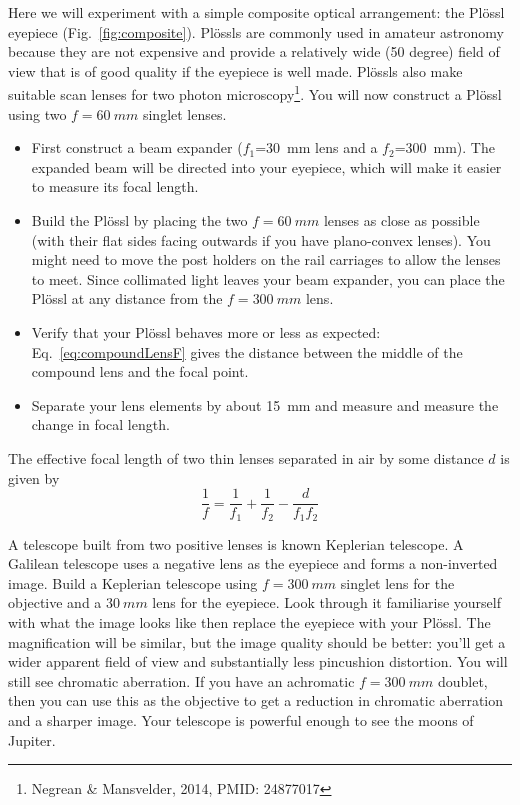 \documentclass[a4paper]{report}
\begin{document}
Here we will experiment with a simple composite optical arrangement: the Pl\"{o}ssl eyepiece (Fig.~\ref{fig:composite}). 
Pl\"{o}ssls are commonly used in amateur astronomy because they are not expensive and provide a relatively wide (50 degree) field of view that is of good 
quality if the eyepiece is well made. 
Pl\"{o}ssls also make suitable scan lenses for two photon microscopy\footnote{Negrean \& Mansvelder, 2014, PMID: 24877017}.
You will now construct a Pl\"{o}ssl using two $f=60~mm$ singlet lenses.


\begin{itemize}
\item First construct a beam expander ($f_1$=30~mm lens and a $f_2$=300~mm). 
The expanded beam will be directed into your eyepiece, which will make it easier to measure its focal length.
\item Build the Pl\"ossl by placing the two $f=60~mm$ lenses as close as possible (with their flat sides facing outwards if you have plano-convex lenses). 
You might need to move the post holders on the rail carriages to allow the lenses to meet.
Since collimated light leaves your beam expander, you can place the Pl\"ossl at any distance from the $f=300~mm$ lens. 
\item Verify that your Pl\"{o}ssl behaves more or less as expected: 
Eq.~\ref{eq:compoundLensF} gives the distance between the middle of the compound lens and the focal point. 
\item Separate your lens elements by about 15~mm and measure and measure the change in focal length.
\end{itemize}

The effective focal length of two thin lenses separated in air by some distance $d$ is given by
\begin{equation}
\frac{1}{f} = \frac{1}{f_1} + \frac{1}{f_2} - \frac{d}{f_1f_2}
\label{eq:compoundLensF}
\end{equation}

A telescope built from two positive lenses is known Keplerian telescope. 
A Galilean telescope uses a negative lens as the eyepiece and forms a non-inverted image.
Build a Keplerian telescope using $f=300~mm$ singlet lens for the objective and a $30~mm$ lens for the eyepiece. 
Look through it familiarise yourself with what the image looks like then replace the eyepiece with your Pl\"{o}ssl. 
The magnification will be similar, but the image quality should be better: you'll get a wider apparent field of view and substantially less pincushion distortion. 
You will still see chromatic aberration. 
If you have an achromatic $f=300~mm$ doublet, then you can use this as the objective to get a reduction in chromatic aberration and a sharper image. 
Your telescope is powerful enough to see the moons of Jupiter. 
\end{document}
